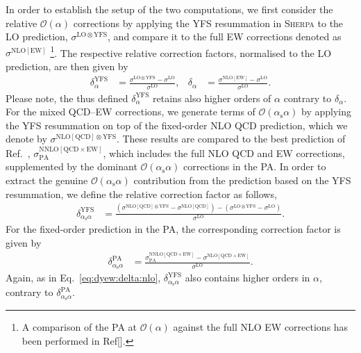\documentclass[11pt]{cernrep}
\newcommand{\order}{\ensuremath{\mathcal{O}}}
\newcommand{\alphas}{\ensuremath{\alpha_\mathrm{s}}}
\newcommand{\rLO}{\ensuremath{\mathrm{LO}}}
\newcommand{\rNLO}{\ensuremath{\mathrm{NLO}}}
\newcommand{\rNNLO}{\ensuremath{\mathrm{NNLO}}}
\newcommand{\rQCD}{\ensuremath{\mathrm{QCD}}}
\newcommand{\rEW}{\ensuremath{\mathrm{EW}}}
\newcommand{\rYFS}{\ensuremath{\mathrm{YFS}}}
\newcommand{\rPA}{\ensuremath{\mathrm{PA}}}
\begin{document}
In order to establish the setup of the two computations, we first 
consider the relative $\order(\alpha)$ corrections by applying 
the YFS resummation in \textsc{Sherpa} to the LO prediction, 
$\sigma^{\rLO\otimes\rYFS}$, and compare it to the full 
EW corrections denoted as $\sigma^{\rNLO[\rEW]}$%
\footnote{
  A comparison of the PA at $\order(\alpha)$ against the full 
  NLO EW corrections has been performed in Ref[].
}.
The respective relative correction factors, normalised to the LO 
prediction, are then given by
\begin{align}
  \label{eq:dyew:delta:nlo}
  \delta_\alpha^\rYFS &= 
  \frac{\sigma^{\rLO\otimes\rYFS} - \sigma^\rLO}{\sigma^\rLO}
  , &
  \delta_\alpha &= 
  \frac{\sigma^{\rNLO[\rEW]} - \sigma^\rLO}{\sigma^\rLO}
  .
\end{align}
Please note, the thus defined $\delta_\alpha^\rYFS$ retains also 
higher orders of $\alpha$ contrary to $\delta_\alpha$. For the 
mixed QCD--EW corrections, we generate terms of $\order(\alphas\alpha)$ 
by applying the YFS resummation on top of the fixed-order NLO QCD 
prediction, which we denote by $\sigma^{\rNLO[\rQCD]\otimes\rYFS}$.
These results are compared to the best prediction of 
Ref.~\cite{Dittmaier:2015rxo}, $\sigma^{\rNNLO[\rQCD\times\rEW]}_{\rPA}$, 
which includes the full NLO QCD and EW corrections, supplemented by 
the dominant $\order(\alphas\alpha)$ corrections in the PA. In order 
to extract the genuine $\order(\alphas\alpha)$ contribution from the 
prediction based on the YFS resummation, we define the relative 
correction factor as follows,
\begin{align}
  \label{eq:dyew:delta:nnlo:yfs}
  \delta_{\alphas\alpha}^\rYFS &= 
  \frac{ (\sigma^{\rNLO[\rQCD]\otimes\rYFS} - \sigma^{\rNLO[\rQCD]}) 
        -(\sigma^{\rLO\otimes\rYFS} - \sigma^\rLO)}
       {\sigma^\rLO} .
\end{align}
For the fixed-order prediction in the PA, the corresponding correction 
factor is given by
\begin{align}
  \label{eq:dyew:delta:nnlo:pa}
  \delta_{\alphas\alpha}^\rPA &= 
    \frac{\sigma^{\rNNLO[\rQCD\times\rEW]}_{\rPA} - \sigma^{\rNLO[\rQCD+\rEW]}}
       {\sigma^\rLO} .
\end{align}
Again, as in Eq.~\ref{eq:dyew:delta:nlo}, $\delta_{\alphas\alpha}^\rYFS$ 
also contains higher orders in $\alpha$, contrary to 
$\delta_{\alphas\alpha}^\rPA$.
\end{document}
